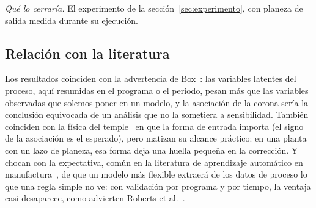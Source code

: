 \emph{Qué lo cerraría.} El experimento de la sección~\ref{sec:experimento}, con planeza de salida medida durante su
ejecución.

\subsection{Relación con la literatura}
Los resultados coinciden con la advertencia de Box~\cite{box1966}: las variables latentes del proceso, aquí resumidas
en el programa o el periodo, pesan más que las variables observadas que solemos poner en un modelo, y la asociación de
la corona sería la conclusión equivocada de un análisis que no la sometiera a sensibilidad. También coinciden con la
física del temple~\cite{lenard2014} en que la forma de entrada importa (el signo de la asociación es el esperado),
pero matizan su alcance práctico: en una planta con un lazo de planeza, esa forma deja una huella pequeña en la
corrección. Y chocan con la expectativa, común en la literatura de aprendizaje automático en manufactura~\cite{wuest2016},
de que un modelo más flexible extraerá de los datos de proceso lo que una regla simple no ve: con validación por
programa y por tiempo, la ventaja casi desaparece, como advierten Roberts et al.~\cite{roberts2017}.

